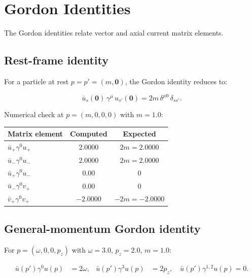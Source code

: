 \section{Gordon Identities}

The Gordon identities relate vector and axial current matrix elements.

\subsection{Rest-frame identity}

For a particle at rest $p=p'=(m,\mathbf{0})$, the Gordon identity reduces to:
\begin{mdframed}[backgroundcolor=blue!5]
\begin{equation}
\bar u_s(\mathbf{0})\,\gamma^\mu\,u_{s'}(\mathbf{0})
 = 2m\,\delta^{\mu 0}\,\delta_{ss'} .
\tag{38.20}
\end{equation}
\end{mdframed}

Numerical check at $p=(m,0,0,0)$ with $m=1.0$:
\begin{center}
\begin{tabular}{l|c|c}
Matrix element & Computed & Expected \\ \hline
$\bar u_+\gamma^0 u_+$ & $2.0000$ & $2m=2.0000$ \\
$\bar u_-\gamma^0 u_-$ & $2.0000$ & $2m=2.0000$ \\
$\bar u_+\gamma^0 u_-$ & $0.00$ & $0$ \\
$\bar u_-\gamma^0 v_+$ & $0.00$ & $0$ \\
$\bar v_+\gamma^0 v_+$ & $-2.0000$ & $-2m=-2.0000$ \\
\end{tabular}
\end{center}

\subsection{General-momentum Gordon identity}

For $p=(\omega,0,0,p_z)$ with $\omega=3.0$, $p_z=2.0$, $m=1.0$:

\begin{mdframed}[backgroundcolor=blue!5]
\begin{align}
\bar u(p')\gamma^0 u(p) &= 2\omega , &
\bar u(p')\gamma^3 u(p) &= 2p_z , \quad
\bar u(p')\gamma^{1,2} u(p) = 0 .
\end{align}
\end{mdframed}

